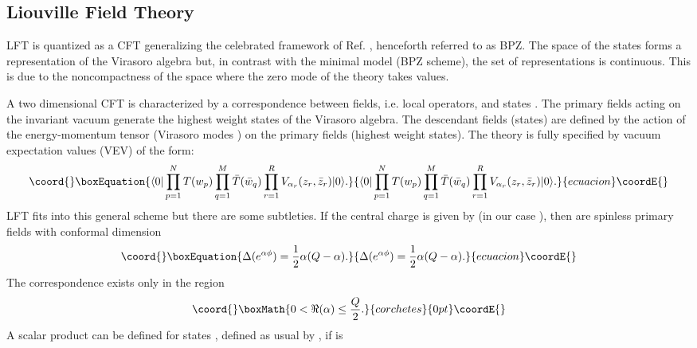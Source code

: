 \documentclass[a4paper,aps,prd,twocolumn,groupedaddress]{revtex4}
\begin{document}
\subsection{Liouville Field Theory}
LFT is quantized as a CFT generalizing the celebrated framework of
Ref. \cite{bpz}, henceforth referred to as BPZ. The space of the
states forms a representation of the Virasoro algebra but, in contrast
with the minimal model (BPZ scheme), the set of representations is
continuous. This is due to the noncompactness of the space where the
zero mode of the theory takes values.

A two dimensional CFT is characterized by a correspondence between
fields, i.e. local operators, and states \cite{cft}. The primary
fields \coordHE{} acting on the \coordHE{} invariant vacuum \myHighlight{$|0\rangle$}\coordHE{}
generate the highest weight states of the Virasoro algebra. The
descendant fields (states) are defined by the action of the
energy-momentum tensor \coordHE{} (Virasoro modes \coordHE{}) on the primary
fields (highest weight states). The theory is fully specified by
vacuum expectation values (VEV) of the form:
\begin{equation}\coord{}\boxEquation{\label{e:vacuum}
\langle 0 | \prod_{p=1}^N T(w_p) \prod_{q=1}^M \bar{T}(\bar{w}_q)
\prod_{r=1}^R V_{\alpha_r}(z_r,\bar{z}_r) | 0 \rangle .
}{\langle 0 | \prod_{p=1}^N T(w_p) \prod_{q=1}^M \bar{T}(\bar{w}_q)
\prod_{r=1}^R V_{\alpha_r}(z_r,\bar{z}_r) | 0 \rangle .
}{ecuacion}\coordE{}\end{equation}
LFT fits into this general scheme but there are some subtleties. 
If the central
charge is given by \coordHE{} (in our case \coordHE{}),
then \coordHE{} are spinless primary fields with conformal
dimension
\begin{equation}\coord{}\boxEquation{\label{e:dim}
\Delta(e^{\alpha\phi}) = \frac{1}{2}\alpha(Q-\alpha).
}{\Delta(e^{\alpha\phi}) = \frac{1}{2}\alpha(Q-\alpha).
}{ecuacion}\coordE{}\end{equation}
The correspondence exists only in the
region
\begin{displaymath}\coord{}\boxMath{
0 < \Re(\alpha) \le \frac{Q}{2}.
}{corchetes}{0pt}\coordE{}\end{displaymath}
A scalar product can be defined for states \myHighlight{$|\alpha \rangle$}\coordHE{}, defined
as usual by \coordHE{}, if \myHighlight{$\alpha$}\coordHE{} is
\end{document}
